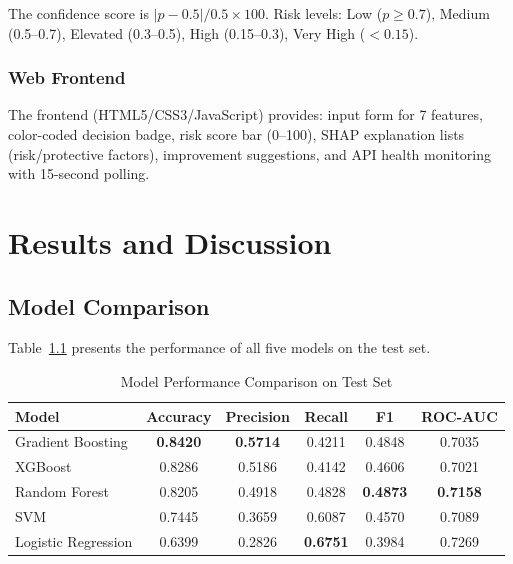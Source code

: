 \documentclass[12pt]{report}
\begin{document}
The confidence score is $|p - 0.5|/0.5 \times 100$. Risk levels: Low ($p \geq 0.7$), Medium (0.5--0.7), Elevated (0.3--0.5), High (0.15--0.3), Very High ($< 0.15$).

\subsection{Web Frontend}

The frontend (HTML5/CSS3/JavaScript) provides: input form for 7 features, color-coded decision badge, risk score bar (0--100), SHAP explanation lists (risk/protective factors), improvement suggestions, and API health monitoring with 15-second polling.



\chapter{Results and Discussion}

\section{Model Comparison}

Table~\ref{tab:model_results} presents the performance of all five models on the test set.

\begin{table}[H]
\centering
\caption{Model Performance Comparison on Test Set}
\label{tab:model_results}
\begin{tabular}{lccccc}
\toprule
\textbf{Model} & \textbf{Accuracy} & \textbf{Precision} & \textbf{Recall} & \textbf{F1} & \textbf{ROC-AUC} \\
\midrule
Gradient Boosting & \textbf{0.8420} & \textbf{0.5714} & 0.4211 & 0.4848 & 0.7035 \\
XGBoost & 0.8286 & 0.5186 & 0.4142 & 0.4606 & 0.7021 \\
Random Forest & 0.8205 & 0.4918 & 0.4828 & \textbf{0.4873} & \textbf{0.7158} \\
SVM & 0.7445 & 0.3659 & 0.6087 & 0.4570 & 0.7089 \\
Logistic Regression & 0.6399 & 0.2826 & \textbf{0.6751} & 0.3984 & 0.7269 \\
\bottomrule
\end{tabular}
\end{table}
\end{document}

